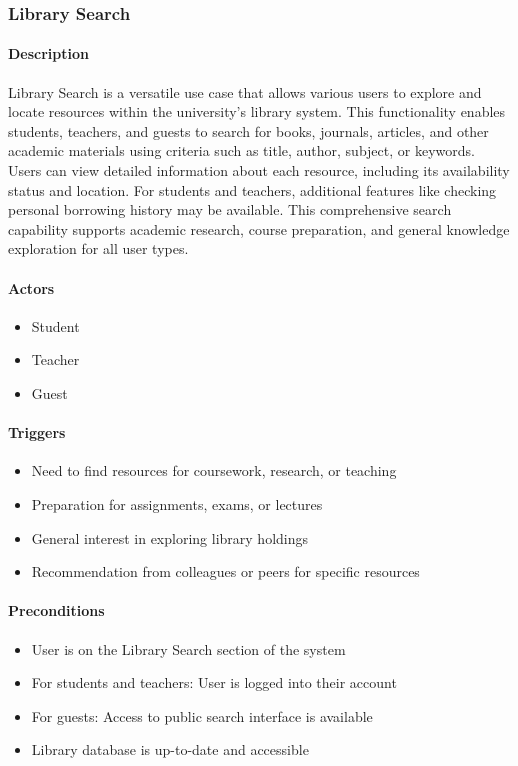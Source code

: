 \subsubsection{Library Search}

\paragraph{Description}
Library Search is a versatile use case that allows various users to explore and locate resources within the university's library system. This functionality enables students, teachers, and guests to search for books, journals, articles, and other academic materials using criteria such as title, author, subject, or keywords. Users can view detailed information about each resource, including its availability status and location. For students and teachers, additional features like checking personal borrowing history may be available. This comprehensive search capability supports academic research, course preparation, and general knowledge exploration for all user types.

\paragraph{Actors}
\begin{itemize}
    \item Student
    \item Teacher
    \item Guest
\end{itemize}

\paragraph{Triggers}
\begin{itemize}
    \item Need to find resources for coursework, research, or teaching
    \item Preparation for assignments, exams, or lectures
    \item General interest in exploring library holdings
    \item Recommendation from colleagues or peers for specific resources
\end{itemize}

\paragraph{Preconditions}
\begin{itemize}
    \item User is on the Library Search section of the system
    \item For students and teachers: User is logged into their account
    \item For guests: Access to public search interface is available
    \item Library database is up-to-date and accessible
\end{itemize}

